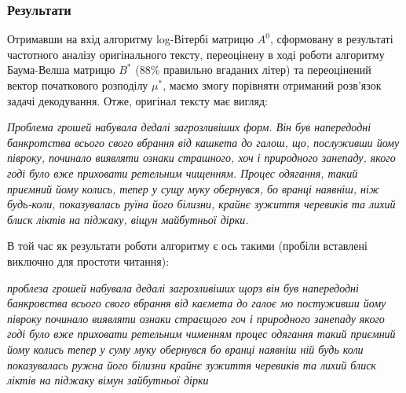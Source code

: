 \subsubsection*{Результати}

Отримавши на вхід алгоритму log-Вітербі матрицю $A^0$, сформовану в результаті частотного аналізу оригінального тексту, переоцінену в ході роботи алгоритму Баума-Велша матрицю $B^*$ (88\% правильно вгаданих літер) та переоцінений вектор початкового розподілу $\mu^*$, маємо змогу порівняти отриманий розв'язок задачі декодування. Отже, оригінал тексту має вигляд:

\vspace{0.2cm}
\begin{mdframed}[style=text box]
    \hspace{\tabsize}\textsl{
    Проблема грошей набувала дедалі загрозливіших форм. Він був напередодні банкротства всього свого вбрання від кашкета до галош, що, послуживши йому півроку, починало виявляти ознаки страшного, хоч і природного занепаду, якого годі було вже приховати ретельним чищенням. Процес одягання, такий приємний йому колись, тепер у сущу муку обернувся, бо вранці наявніш, ніж будь-коли, показувалась руїна його білизни, крайнє зужиття черевиків та лихий блиск ліктів на піджаку, віщун майбутньої дірки.}
\end{mdframed}

\vspace{0.2cm}
В той час як результати роботи алгоритму є ось такими (пробіли вставлені виключно для простоти читання):

\vspace{0.2cm}
\begin{mdframed}[style=text box]
    \hspace{\tabsize}\textsl{
    проблеза грошей набувала дедалі загрозливіших щорз він був напередодні банкровства всього свого вбрання від каємета до галоє мо постуживши йому півроку починало виявляти ознаки страєщого гоч і природного занепаду якого годі було вже приховати ретельним чименням процес одягання такий приємний йому колись тепер у суму муку обернувся бо вранці наявніш ній будь коли показувалась ружна його білизни крайнє зужиття черевиків та лихий блиск ліктів на піджаку вімун зайбутньої дірки}
\end{mdframed}